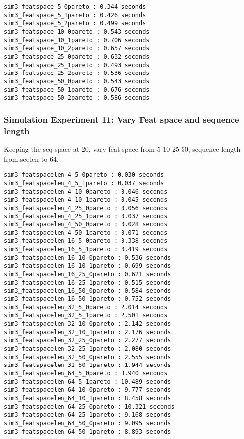\documentclass{article}
\begin{document}
\begin{verbatim}
sim3_featspace_5_0pareto : 0.344 seconds
sim3_featspace_5_1pareto : 0.426 seconds
sim3_featspace_5_2pareto : 0.499 seconds
sim3_featspace_10_0pareto : 0.543 seconds
sim3_featspace_10_1pareto : 0.706 seconds
sim3_featspace_10_2pareto : 0.657 seconds
sim3_featspace_25_0pareto : 0.632 seconds
sim3_featspace_25_1pareto : 0.493 seconds
sim3_featspace_25_2pareto : 0.536 seconds
sim3_featspace_50_0pareto : 0.543 seconds
sim3_featspace_50_1pareto : 0.676 seconds
sim3_featspace_50_2pareto : 0.586 seconds
\end{verbatim}

\subsubsection{Simulation Experiment 11: Vary Feat space and sequence length}
\label{sim:featspacelen}
Keeping the seq space at 20, vary feat space from 5-10-25-50, sequence length from seqlen to 64.

\begin{verbatim}
sim3_featspacelen_4_5_0pareto : 0.030 seconds
sim3_featspacelen_4_5_1pareto : 0.037 seconds
sim3_featspacelen_4_10_0pareto : 0.046 seconds
sim3_featspacelen_4_10_1pareto : 0.045 seconds
sim3_featspacelen_4_25_0pareto : 0.056 seconds
sim3_featspacelen_4_25_1pareto : 0.037 seconds
sim3_featspacelen_4_50_0pareto : 0.028 seconds
sim3_featspacelen_4_50_1pareto : 0.071 seconds
sim3_featspacelen_16_5_0pareto : 0.338 seconds
sim3_featspacelen_16_5_1pareto : 0.419 seconds
sim3_featspacelen_16_10_0pareto : 0.536 seconds
sim3_featspacelen_16_10_1pareto : 0.699 seconds
sim3_featspacelen_16_25_0pareto : 0.621 seconds
sim3_featspacelen_16_25_1pareto : 0.515 seconds
sim3_featspacelen_16_50_0pareto : 0.584 seconds
sim3_featspacelen_16_50_1pareto : 0.752 seconds
sim3_featspacelen_32_5_0pareto : 2.014 seconds
sim3_featspacelen_32_5_1pareto : 2.501 seconds
sim3_featspacelen_32_10_0pareto : 2.142 seconds
sim3_featspacelen_32_10_1pareto : 2.176 seconds
sim3_featspacelen_32_25_0pareto : 2.277 seconds
sim3_featspacelen_32_25_1pareto : 2.080 seconds
sim3_featspacelen_32_50_0pareto : 2.555 seconds
sim3_featspacelen_32_50_1pareto : 1.944 seconds
sim3_featspacelen_64_5_0pareto : 8.940 seconds
sim3_featspacelen_64_5_1pareto : 10.489 seconds
sim3_featspacelen_64_10_0pareto : 9.777 seconds
sim3_featspacelen_64_10_1pareto : 8.458 seconds
sim3_featspacelen_64_25_0pareto : 10.321 seconds
sim3_featspacelen_64_25_1pareto : 9.168 seconds
sim3_featspacelen_64_50_0pareto : 9.095 seconds
sim3_featspacelen_64_50_1pareto : 8.893 seconds
\end{verbatim}
%
\end{document}

